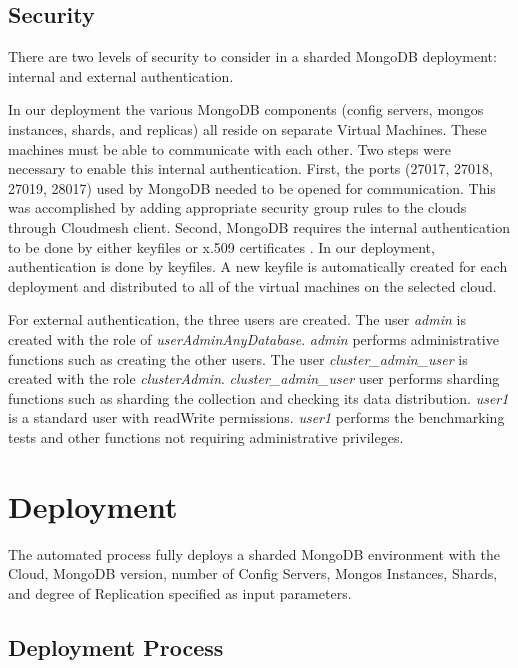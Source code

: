 \documentclass[9pt,twocolumn,twoside]{../../styles/osajnl}
\begin{document}
\subsection{Security}

There are two levels of security to consider in a sharded MongoDB deployment: internal and external authentication.

In our deployment the various MongoDB components (config servers, mongos instances, shards, and replicas) all reside on separate Virtual Machines.  These machines must be able to communicate with each other.  Two steps were necessary to enable this internal authentication.  First, the ports (27017, 27018, 27019, 28017) used by MongoDB needed to be opened for communication.  This was accomplished by adding appropriate security group rules to the clouds through Cloudmesh client.  Second, MongoDB requires the internal authentication to be done by either keyfiles or x.509 certificates  \cite{www-mongoAuth}.  In our deployment, authentication is done by keyfiles.  A new keyfile is automatically created for each deployment and distributed to all of the virtual machines on the selected cloud.

For external authentication, the three users are created.  The user \emph{admin} is created with the role of \emph{userAdminAnyDatabase}.  \emph{admin} performs administrative functions such as creating the other users.  The user \emph{cluster\_admin\_user} is created with the role \emph{clusterAdmin}. \emph{cluster\_admin\_user} user performs sharding functions such as sharding the collection and checking its data distribution. \emph{user1} is a standard user with readWrite permissions.  \emph{user1} performs the benchmarking tests and other functions not requiring administrative privileges.



\section{Deployment}


The automated process fully deploys a sharded MongoDB environment with the Cloud, MongoDB version, number of Config Servers, Mongos Instances, Shards, and degree of Replication specified as input parameters.

\subsection{Deployment Process}
\end{document}
